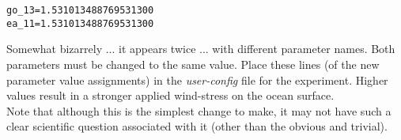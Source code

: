 \begin{enumerate}
\begin{verbatim}
go_13=1.531013488769531300
ea_11=1.531013488769531300
\end{verbatim}\vspace{-2pt}
Somewhat bizarrely ... it appears twice ... with different parameter names. Both parameters must be changed to the same value. Place these lines (of the new parameter value assignments) in the \textit{user-config} file for the experiment. Higher values result in a stronger applied wind-stress on the ocean surface.
\vspace{1mm}
\\Note that although this is the simplest change to make, it may not have such a clear scientific question associated with it (other than the obvious and trivial).
\end{enumerate}




